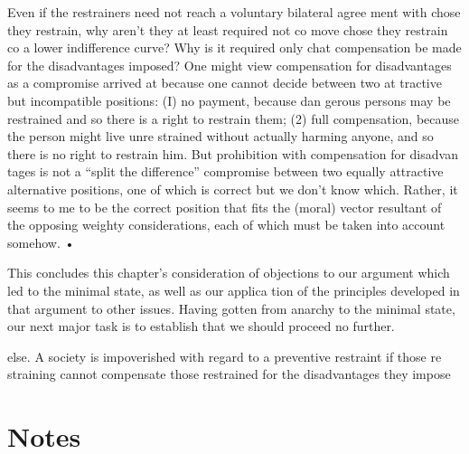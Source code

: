 \documentclass[11pt,openany]{book}
\newcommand{\booknoteshead}{%
  \phantomsection\section*{Notes}%
  \addcontentsline{toc}{section}{Notes}\markright{Notes}}
\begin{document}
Even if the restrainers need not reach a voluntary bilateral agree ment with chose they restrain, why aren't they at least required not co move chose they restrain co a lower indifference curve? Why is it required only chat compensation be made for the disadvantages imposed? One might view compensation for disadvantages as a compromise arrived at because one cannot decide between two at tractive but incompatible positions: (I) no payment, because dan gerous persons may be restrained and so there is a right to restrain them; (2) full compensation, because the person might live unre strained without actually harming anyone, and so there is no right to restrain him. But prohibition with compensation for disadvan tages is not a ``split the difference'' compromise between two equally attractive alternative positions, one of which is correct but we don't know which. Rather, it seems to me to be the correct position that fits the (moral) vector resultant of the opposing weighty considerations, each of which must be taken into account somehow. • 

This concludes this chapter's consideration of objections to our argument which led to the minimal state, as well as our applica tion of the principles developed in that argument to other issues. Having gotten from anarchy to the minimal state, our next major task is to establish that we should proceed no further. 

else. A society is impoverished with regard to a preventive restraint if those re straining cannot compensate those restrained for the disadvantages they impose 

\booknoteshead
\end{document}
